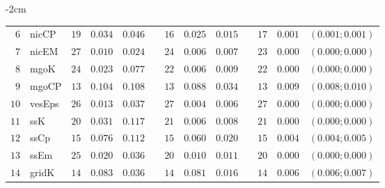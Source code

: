 \begin{table*}[!htbp]
\begin{adjustwidth*}{}{-2cm}
\begin{tabular}{@{}rlrrrrrrrrrcc@{}}
\footnotesize{$6 $} & \footnotesize{nicCP    } & \footnotesize{$19$} & \footnotesize{$0.034$} & \footnotesize{$0.046$} && \footnotesize{$16$} & \footnotesize{$0.025$} & \footnotesize{$0.015$} && \footnotesize{$17$} & \footnotesize{$0.001$} & \footnotesize{$(0.001;0.001)$} \\
\footnotesize{$7 $} & \footnotesize{nicEM    } & \footnotesize{$27$} & \footnotesize{$0.010$} & \footnotesize{$0.024$} && \footnotesize{$24$} & \footnotesize{$0.006$} & \footnotesize{$0.007$} && \footnotesize{$23$} & \footnotesize{$0.000$} & \footnotesize{$(0.000;0.000)$} \\
\footnotesize{$8 $} & \footnotesize{mgoK     } & \footnotesize{$24$} & \footnotesize{$0.023$} & \footnotesize{$0.077$} && \footnotesize{$22$} & \footnotesize{$0.006$} & \footnotesize{$0.009$} && \footnotesize{$22$} & \footnotesize{$0.000$} & \footnotesize{$(0.000;0.000)$} \\
\footnotesize{$9 $} & \footnotesize{mgoCP    } & \footnotesize{$13$} & \footnotesize{$0.104$} & \footnotesize{$0.108$} && \footnotesize{$13$} & \footnotesize{$0.088$} & \footnotesize{$0.034$} && \footnotesize{$13$} & \footnotesize{$0.009$} & \footnotesize{$(0.008;0.010)$} \\
\footnotesize{$10$} & \footnotesize{vesEps   } & \footnotesize{$26$} & \footnotesize{$0.013$} & \footnotesize{$0.037$} && \footnotesize{$27$} & \footnotesize{$0.004$} & \footnotesize{$0.006$} && \footnotesize{$27$} & \footnotesize{$0.000$} & \footnotesize{$(0.000;0.000)$} \\
\footnotesize{$11$} & \footnotesize{ssK      } & \footnotesize{$20$} & \footnotesize{$0.031$} & \footnotesize{$0.117$} && \footnotesize{$21$} & \footnotesize{$0.006$} & \footnotesize{$0.008$} && \footnotesize{$21$} & \footnotesize{$0.000$} & \footnotesize{$(0.000;0.000)$} \\
\footnotesize{$12$} & \footnotesize{ssCp     } & \footnotesize{$15$} & \footnotesize{$0.076$} & \footnotesize{$0.112$} && \footnotesize{$15$} & \footnotesize{$0.060$} & \footnotesize{$0.020$} && \footnotesize{$15$} & \footnotesize{$0.004$} & \footnotesize{$(0.004;0.005)$} \\
\footnotesize{$13$} & \footnotesize{ssEm     } & \footnotesize{$25$} & \footnotesize{$0.020$} & \footnotesize{$0.036$} && \footnotesize{$20$} & \footnotesize{$0.010$} & \footnotesize{$0.011$} && \footnotesize{$20$} & \footnotesize{$0.000$} & \footnotesize{$(0.000;0.000)$} \\
\footnotesize{$14$} & \footnotesize{gridK    } & \footnotesize{$14$} & \footnotesize{$0.083$} & \footnotesize{$0.036$} && \footnotesize{$14$} & \footnotesize{$0.081$} & \footnotesize{$0.016$} && \footnotesize{$14$} & \footnotesize{$0.006$} & \footnotesize{$(0.006;0.007)$} \\

\end{tabular}
\end{adjustwidth*}
\end{table*}
